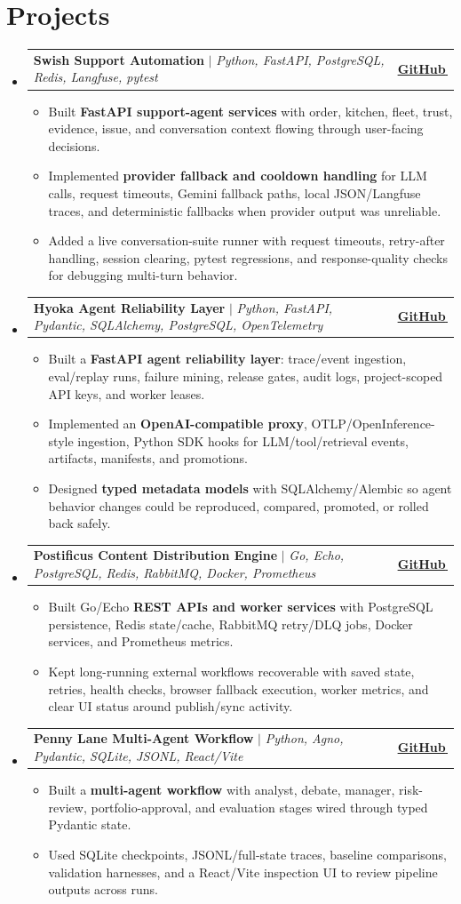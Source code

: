 \documentclass[letterpaper,11pt]{article}
\makeatletter
\newcommand{\bodyhref}[2]{\href{#1}{\underline{#2}\,\faExternalLink*}}
\newcommand{\resumeItem}[1]{\item{\fontsize{8.85pt}{9.25pt}\selectfont #1\vspace{-0.5pt}}}
\newcommand{\resumeProjectHeading}[2]{
    \item
    \begin{tabular*}{1.0\textwidth}{l@{\extracolsep{\fill}}r}
      \small#1 & \textbf{\small #2}\\
    \end{tabular*}\vspace{-4pt}
}
\newcommand{\resumeSubHeadingListStart}{\begin{itemize}[leftmargin=0.0in, label={}, itemsep=0.6pt, topsep=0pt, parsep=0pt, partopsep=0pt]}
\newcommand{\resumeSubHeadingListEnd}{\end{itemize}}
\newcommand{\resumeItemListStart}{\begin{itemize}[leftmargin=0.16in,itemsep=0.35pt,topsep=0.55pt,parsep=0pt,partopsep=0pt]}
\newcommand{\resumeItemListEnd}{\end{itemize}\vspace{-3pt}}
\makeatother
\begin{document}
\section{Projects}
\resumeSubHeadingListStart
\resumeProjectHeading
{\textbf{Swish Support Automation} $|$ \emph{Python, FastAPI, PostgreSQL, Redis, Langfuse, pytest}}{\bodyhref{https://github.com/unichronic/swishagent}{GitHub}}
\resumeItemListStart
\resumeItem{Built \textbf{FastAPI support-agent services} with order, kitchen, fleet, trust, evidence, issue, and conversation context flowing through user-facing decisions.}
\resumeItem{Implemented \textbf{provider fallback and cooldown handling} for LLM calls, request timeouts, Gemini fallback paths, local JSON/Langfuse traces, and deterministic fallbacks when provider output was unreliable.}
\resumeItem{Added a live conversation-suite runner with request timeouts, retry-after handling, session clearing, pytest regressions, and response-quality checks for debugging multi-turn behavior.}
\resumeItemListEnd
\resumeProjectHeading
{\textbf{Hyoka Agent Reliability Layer} $|$ \emph{Python, FastAPI, Pydantic, SQLAlchemy, PostgreSQL, OpenTelemetry}}{\bodyhref{https://github.com/unichronic/hyoka}{GitHub}}
\resumeItemListStart
\resumeItem{Built a \textbf{FastAPI agent reliability layer}: trace/event ingestion, eval/replay runs, failure mining, release gates, audit logs, project-scoped API keys, and worker leases.}
\resumeItem{Implemented an \textbf{OpenAI-compatible proxy}, OTLP/OpenInference-style ingestion, Python SDK hooks for LLM/tool/retrieval events, artifacts, manifests, and promotions.}
\resumeItem{Designed \textbf{typed metadata models} with SQLAlchemy/Alembic so agent behavior changes could be reproduced, compared, promoted, or rolled back safely.}
\resumeItemListEnd
\resumeProjectHeading
{\textbf{Postificus Content Distribution Engine} $|$ \emph{Go, Echo, PostgreSQL, Redis, RabbitMQ, Docker, Prometheus}}{\bodyhref{https://github.com/unichronic/postificus}{GitHub}}
\resumeItemListStart
\resumeItem{Built Go/Echo \textbf{REST APIs and worker services} with PostgreSQL persistence, Redis state/cache, RabbitMQ retry/DLQ jobs, Docker services, and Prometheus metrics.}
\resumeItem{Kept long-running external workflows recoverable with saved state, retries, health checks, browser fallback execution, worker metrics, and clear UI status around publish/sync activity.}
\resumeItemListEnd
\resumeProjectHeading
{\textbf{Penny Lane Multi-Agent Workflow} $|$ \emph{Python, Agno, Pydantic, SQLite, JSONL, React/Vite}}{\bodyhref{https://github.com/unichronic/pennylane}{GitHub}}
\resumeItemListStart
\resumeItem{Built a \textbf{multi-agent workflow} with analyst, debate, manager, risk-review, portfolio-approval, and evaluation stages wired through typed Pydantic state.}
\resumeItem{Used SQLite checkpoints, JSONL/full-state traces, baseline comparisons, validation harnesses, and a React/Vite inspection UI to review pipeline outputs across runs.}
\resumeItemListEnd
\resumeSubHeadingListEnd
\end{document}
